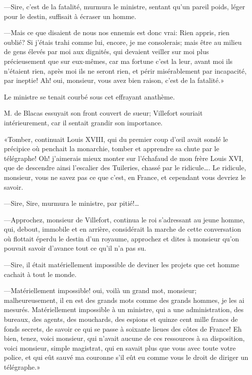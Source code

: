 —Sire, c'est de la fatalité, murmura le ministre, sentant qu'un pareil poids, léger pour le destin, suffisait à écraser un homme.

—Mais ce que disaient de nous nos ennemis est donc vrai: Rien appris, rien oublié? Si j'étais trahi comme lui, encore, je me consolerais; mais être au milieu de gens élevés par moi aux dignités, qui devaient veiller sur moi plus précieusement que sur eux-mêmes, car ma fortune c'est la leur, avant moi ils n'étaient rien, après moi ils ne seront rien, et périr misérablement par incapacité, par ineptie! Ah! oui, monsieur, vous avez bien raison, c'est de la fatalité.»

Le ministre se tenait courbé sous cet effrayant anathème.

M. de Blacas essuyait son front couvert de sueur; Villefort souriait intérieurement, car il sentait grandir son importance.

«Tomber, continuait Louis XVIII, qui du premier coup d'œil avait sondé le précipice où penchait la monarchie, tomber et apprendre sa chute par le télégraphe! Oh! j'aimerais mieux monter sur l'échafaud de mon frère Louis XVI, que de descendre ainsi l'escalier des Tuileries, chassé par le ridicule\dots. Le ridicule, monsieur, vous ne savez pas ce que c'est, en France, et cependant vous devriez le savoir.

—Sire, Sire, murmura le ministre, par pitié!\dots

—Approchez, monsieur de Villefort, continua le roi s'adressant au jeune homme, qui, debout, immobile et en arrière, considérait la marche de cette conversation où flottait éperdu le destin d'un royaume, approchez et dites à monsieur qu'on pouvait savoir d'avance tout ce qu'il n'a pas su.

—Sire, il était matériellement impossible de deviner les projets que cet homme cachait à tout le monde.

—Matériellement impossible! oui, voilà un grand mot, monsieur; malheureusement, il en est des grands mots comme des grands hommes, je les ai mesurés. Matériellement impossible à un ministre, qui a une administration, des bureaux, des agents, des mouchards, des espions et quinze cent mille francs de fonds secrets, de savoir ce qui se passe à soixante lieues des côtes de France! Eh bien, tenez, voici monsieur, qui n'avait aucune de ces ressources à sa disposition, voici monsieur, simple magistrat, qui en savait plus que vous avec toute votre police, et qui eût sauvé ma couronne s'il eût eu comme vous le droit de diriger un télégraphe.»

